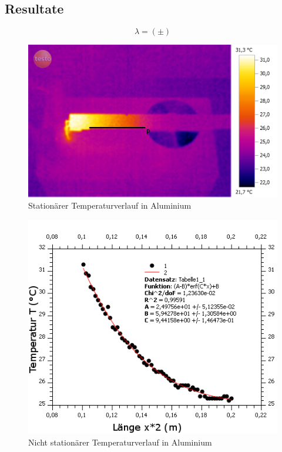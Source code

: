 \documentclass[12pt,a4paper]{article}
\begin{document}
\begin{multicols}{2}
\subsection{Resultate}

$$\lambda = ( \pm )$$
\begin{figure}[H]
	\centering
	\includegraphics[scale=0.12]{./BilderCorrect/Versuch_1_stationaer_roh.png}
	\caption{Stationärer Temperaturverlauf in Aluminium}
	\label{fig:stat_verlauf}
\end{figure}

\end{multicols}
\begin{figure}[H]
	\centering
	\includegraphics[scale=7]{./BilderCorrect/nicht_stationaer_temp_verlauf.png}
	\caption{Nicht stationärer Temperaturverlauf in Aluminium }
	\label{fig:nicht_stat_verlauf}
\end{figure}
\end{document}
